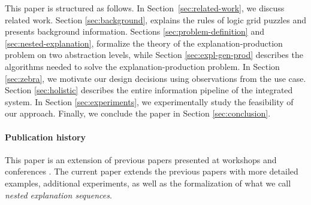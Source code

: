 This paper is structured as follows. In Section~\ref{sec:related-work}, we discuss related work. Section \ref{sec:background}, explains the rules of logic grid puzzles and presents background information. 
Sections \ref{sec:problem-definition} and \ref{sec:nested-explanation}, formalize the theory of the explanation-production problem on two abstraction levels, while Section \ref{sec:expl-gen-prod} describes the algorithms needed to solve the explanation-production problem.
In Section \ref{sec:zebra}, we motivate our design decisions using observations from the \ourtool use case. 
Section \ref{sec:holistic} describes the entire information pipeline of the \ourtool integrated system. 
In Section \ref{sec:experiments}, we experimentally study the feasibility of our approach. 
Finally, we conclude the paper in Section \ref{sec:conclusion}.


\paragraph{Publication history} This paper is an extension of previous papers presented at workshops and conferences \cite{claesuser,DBLP:conf/bnaic/ClaesBCGG19,ecai/BogaertsGCG20}. The current paper extends the previous papers with more detailed examples, additional experiments, as well as the formalization of what we call \emph{nested explanation sequences}.

